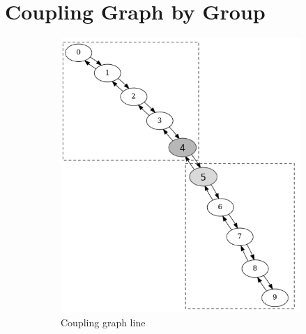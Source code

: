 \chapter{Coupling Graph by Group} \label{app:coupling-graph-by-group}
\begin{figure}[!htb]
    \begin{subfigure}{0.4\linewidth}
        \includegraphics[width=\linewidth]{image/coupling_graph_line.png}
        \caption{Coupling graph line}
        \label{fig:coupling-graph-line}
    \end{subfigure}
    \hfill
    \begin{subfigure}{0.25\linewidth}

\end{subfigure}
\end{figure}
